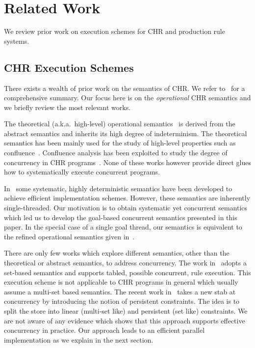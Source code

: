 \documentclass{tlp}
\begin{document}
\section{Related Work} \label{sec:related}

We review prior work on execution schemes 
for CHR and production rule systems.

\subsection{CHR Execution Schemes}

There exists a wealth of prior work on the semantics of CHR. We refer to~\cite{chr-survey}
for a comprehensive summary. Our focus here is on the \emph{operational} CHR semantics
and we briefly review the most relevant works.

The theoretical (a.k.a.~high-level) operational semantics~\cite{fruehwirth98:chr:art}
is derived from the abstract semantics and inherits its high degree of indeterminism.
The theoretical semantics has been mainly used for the study of high-level properties such as
confluence~\cite{abdennadher:confluence,Abdennadher99confluenceand}.
Confluence analysis has been exploited to study the degree
of concurrency in CHR programs~\cite{union-find,DBLP:conf/iclp/SchrijversS08}.
None of these works however provide direct glues how to systematically
execute concurrent programs.

In~\cite{DuckSBH04,rp-chr,rp-chr} some systematic, highly deterministic semantics have been developed
to achieve efficient implementation schemes. However, these semantics are inherently single-threaded.
Our motivation is to obtain systematic yet concurrent semantics which led us to develop
the goal-based concurrent semantics presented in this paper.
In the special case of a single goal thread, our semantics is equivalent 
to the refined operational semantics given in~\cite{DuckSBH04,rp-chr,rp-chr}.

There are only few works which explore different semantics, other than the theoretical or abstract semantics, 
to address concurrency.  The work in~\cite{DBLP:conf/padl/Sarna-StarostaR07} adopts a set-based semantics
and supports tabled, possible concurrent, rule execution. 
This execution scheme is not applicable to
CHR programs in general which usually assume a multi-set based semantics.
The recent work in~\cite{betz_raiser_fru_persistent_constraints_wlp09}
takes a new stab at concurrency by introducing the notion of persistent
constraints. The idea is to split the store into linear (multi-set like) and persistent (set like)
constraints. We are not aware of any evidence which shows that this approach 
supports effective concurrency in practice. Our approach leads to
an efficient parallel implementation as we explain in the next section.
\end{document}
